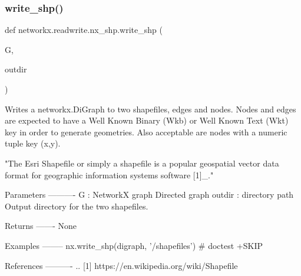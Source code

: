 \subsubsection{\texorpdfstring{write\+\_\+shp()}{write\_shp()}}
{\footnotesize\ttfamily def networkx.\+readwrite.\+nx\+\_\+shp.\+write\+\_\+shp (\begin{DoxyParamCaption}\item[{}]{G,  }\item[{}]{outdir }\end{DoxyParamCaption})}

\begin{DoxyVerb}Writes a networkx.DiGraph to two shapefiles, edges and nodes.
Nodes and edges are expected to have a Well Known Binary (Wkb) or
Well Known Text (Wkt) key in order to generate geometries. Also
acceptable are nodes with a numeric tuple key (x,y).

"The Esri Shapefile or simply a shapefile is a popular geospatial vector
data format for geographic information systems software [1]_."

Parameters
----------
G : NetworkX graph
    Directed graph
outdir : directory path
   Output directory for the two shapefiles.

Returns
-------
None

Examples
--------
nx.write_shp(digraph, '/shapefiles') # doctest +SKIP

References
----------
.. [1] https://en.wikipedia.org/wiki/Shapefile
\end{DoxyVerb}
 